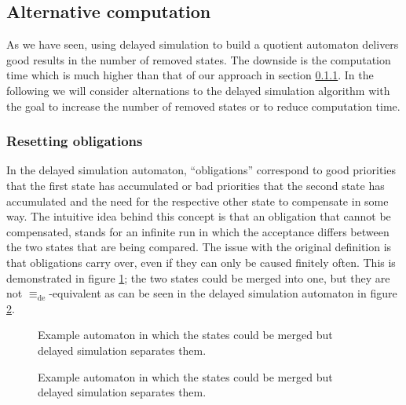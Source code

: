 
\subsection{Alternative computation}
As we have seen, using delayed simulation to build a quotient automaton delivers good results in the number of removed states. The downside is the computation time which is much higher than that of our approach in section \ref{}. In the following we will consider alternations to the delayed simulation algorithm with the goal to increase the number of removed states or to reduce computation time.

\subsubsection{Resetting obligations}
In the delayed simulation automaton, \enquote{obligations} correspond to good priorities that the first state has accumulated or bad priorities that the second state has accumulated and the need for the respective other state to compensate in some way. The intuitive idea behind this concept is that an obligation that cannot be compensated, stands for an infinite run in which the acceptance differs between the two states that are being compared. The issue with the original definition is that obligations carry over, even if they can only be caused finitely often. This is demonstrated in figure \ref{fig:fwe:reset_oblig_example}; the two states could be merged into one, but they are not $\equiv_\text{de}$-equivalent as can be seen in the delayed simulation automaton in figure \ref{fig:fwe:reset_oblig_example_dea}.

\begin{figure}
\centering
{}
\caption{Example automaton in which the states could be merged but delayed simulation separates them.}
\label{fig:fwe:reset_oblig_example}
\end{figure}

\begin{figure}
\centering
{}
\caption{Example automaton in which the states could be merged but delayed simulation separates them.}
\label{fig:fwe:reset_oblig_example_dea}
\end{figure}

